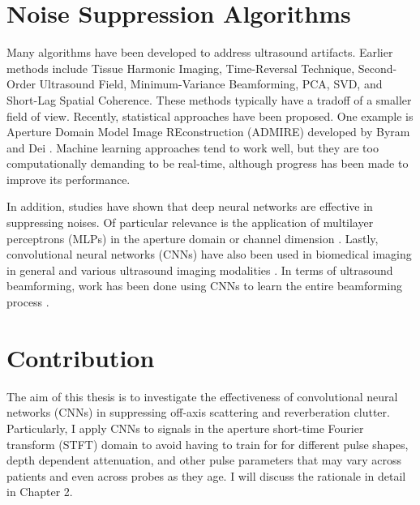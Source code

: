 
\section{Noise Suppression Algorithms}

Many algorithms have been developed to address ultrasound artifacts. Earlier methods include Tissue Harmonic Imaging, Time-Reversal Technique, Second-Order Ultrasound Field, Minimum-Variance Beamforming, PCA, SVD, and Short-Lag Spatial Coherence. These methods typically have a tradoff of a smaller field of view. Recently, statistical approaches have been proposed. One example is Aperture Domain Model Image REconstruction (ADMIRE) developed by Byram and Dei \cite{admire2017}. Machine learning approaches tend to work well, but they are too computationally demanding to be real-time, although progress has been made to improve its performance.

In addition, studies have shown that deep neural networks are effective in suppressing noises. Of particular relevance is the application of multilayer perceptrons (MLPs) in the aperture domain or channel dimension \cite{luchies_tmi_2018}. Lastly, convolutional neural networks (CNNs) have also been used in biomedical imaging in general \cite{unet} and various ultrasound imaging modalities \cite{van_sloun_review}. In terms of ultrasound beamforming, work has been done using CNNs to learn the entire beamforming process \cite{hyun_uffc_2019}.



\section{Contribution} %
The aim of this thesis is to investigate the effectiveness of convolutional neural networks (CNNs) in suppressing off-axis scattering and reverberation clutter. Particularly, I apply CNNs to signals in the aperture short-time Fourier transform (STFT) domain to avoid having to train for for different pulse shapes, depth dependent attenuation, and other pulse parameters that may vary across patients and even across probes as they age. I will discuss the rationale in detail in Chapter 2.

